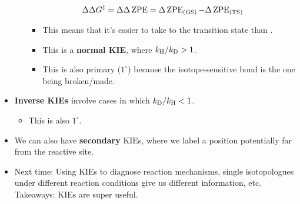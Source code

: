 \documentclass[../notes.tex]{subfiles}
\begin{document}
\begin{itemize}
\begin{itemize}
        \begin{equation*}
            \Delta\Delta G^\ddagger = \Delta\Delta\operatorname{ZPE}
            = \Delta\operatorname{ZPE}_\text{(GS)}-\Delta\operatorname{ZPE}_\text{(TS)}
        \end{equation*}
        \begin{itemize}
            \item This means that it's easier to take  to the transition state than .
            \item This is a \textbf{normal KIE}, where $k_{\ce{H}}/k_{\ce{D}}>1$.
            \item This is also primary ($1^\circ$) because the isotope-sensitive bond is the one being broken/made.
        \end{itemize}
    \end{itemize}
    \item \textbf{Inverse KIEs} involve cases in which $k_{\ce{D}}/k_{\ce{H}}<1$.
    \begin{itemize}
        \item This is also $1^\circ$.
    \end{itemize}
    \item We can also have \textbf{secondary} KIEs, where we label a position potentially far from the reactive site.
    \item Next time: Using KIEs to diagnose reaction mechanisms, single isotopologues under different reaction conditions give us different information, etc. Takeaways: KIEs are super useful.
\end{itemize}
\end{document}
